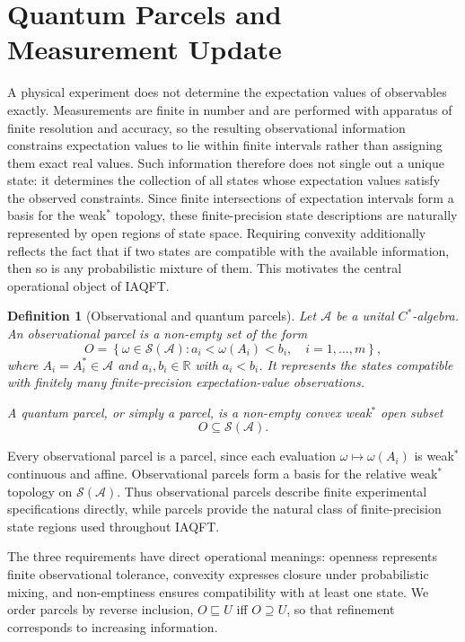 \documentclass[11pt]{article}
\newtheorem{definition}[theorem]{Definition}
\newcommand{\A}{\mathcal{A}}
\begin{document}
\section{Quantum Parcels and Measurement Update}
\label{sec:parcels-update}
A physical experiment does not determine the expectation values of
observables exactly. Measurements are finite in number and are performed
with apparatus of finite resolution and accuracy, so the resulting
observational information constrains expectation values to lie within
finite intervals rather than assigning them exact real values. Such
information therefore does not single out a unique state: it determines
the collection of all states whose expectation values satisfy the
observed constraints. Since finite intersections of expectation intervals
form a basis for the weak$^*$ topology, these finite-precision state
descriptions are naturally represented by open regions of state space.
Requiring convexity additionally reflects the fact that if two states are
compatible with the available information, then so is any probabilistic
mixture of them. This motivates the central operational object of IAQFT.
\begin{definition}[Observational and quantum parcels]
\label{def:quantum-parcel}
Let $\A$ be a unital $C^*$-algebra.
An \emph{observational parcel} is a non-empty set of the form
\[
O
=
\left\{
\omega\in\mathcal S(\A):
a_i<\omega(A_i)<b_i,\quad i=1,\ldots,m
\right\},
\]
where $A_i=A_i^*\in\A$ and $a_i,b_i\in\mathbb R$ with $a_i<b_i$.
It represents the states compatible with finitely many finite-precision
expectation-value observations.

A \emph{quantum parcel}, or simply a \emph{parcel}, is a non-empty
convex weak$^*$ open subset
\[
O\subseteq\mathcal S(\A).
\]
\end{definition}

Every observational parcel is a parcel, since each evaluation
$\omega\mapsto\omega(A_i)$ is weak$^*$ continuous and affine.
Observational parcels form a basis for the relative weak$^*$ topology on
$\mathcal S(\A)$. Thus observational parcels describe finite
experimental specifications directly, while parcels provide the natural
class of finite-precision state regions used throughout IAQFT.

The three requirements have direct operational meanings: openness represents
finite observational tolerance, convexity expresses closure under
probabilistic mixing, and non-emptiness ensures compatibility with at least
one state. We order parcels by reverse inclusion,
$O\sqsubseteq U$ iff $O\supseteq U$, so that refinement corresponds to
increasing information.
\end{document}
